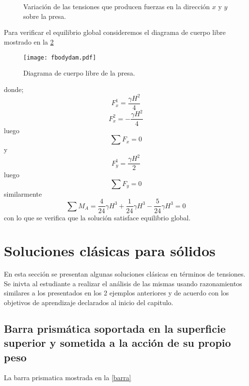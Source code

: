 \documentclass[../notas medios.tex]{subfiles}
\begin{document}
\begin{figure}[H]
     \centering
     \hspace{0.5cm}
     \\
     \hspace{0.5cm}
     \\
     \caption{Variación de las tensiones que producen fuerzas en la dirección $x$ y $y$ sobre la presa.}
     \label{python}
\end{figure}


Para verificar el equilibrio global consideremos el diagrama de cuerpo libre mostrado en la \cref{dcl}

\begin{figure}[H]
\centering
	\texttt{[image: fbodydam.pdf]}
	\caption{Diagrama de cuerpo libre de la presa.}
	\label{dcl}
\end{figure}


donde;
\[F_x^1 = \frac{{\gamma {H^2}}}{4}\]
\[F_x^2 =  - \frac{{\gamma {H^2}}}{4}\]
luego
\[\sum {{F_x} = 0} \]
y
\[F_y^1 = \frac{{\gamma {H^2}}}{2}\]
luego
\[\sum {{F_y} = 0} \]
similarmente
\[\sum {{M_A} = } \frac{4}{{24}}\gamma {H^3} + \frac{1}{{24}}\gamma {H^3} - \frac{5}{{24}}\gamma {H^3} = 0\]
con lo que se verifica que la solución satisface equilibrio global.



\section*{Soluciones clásicas para sólidos}
En esta sección se presentan algunas soluciones clásicas en términos de tensiones. Se inivta al estudiante a realizar el análisis de las mismas usando razonamientos similares a los presentados en los 2 ejemplos anteriores y de acuerdo con los objetivos de aprendizaje declarados al inicio del capitulo.

\subsection*{Barra prismática soportada en la superficie superior y sometida a la acción de su propio peso}

La barra prismatica mostrada en la \cref{barra}
\end{document}
